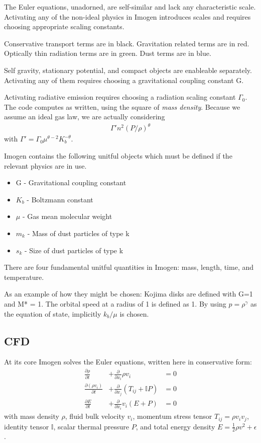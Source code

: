 \documentclass[letterpaper,12pt]{article}
\begin{document}
The Euler equations, unadorned, are self-similar and lack any characteristic scale. Activating
any of the non-ideal physics in Imogen introduces scales and requires choosing appropriate scaling
constants.

Conservative transport terms are in black. Gravitation related terms are in red.
Optically thin radiation terms are in green. Dust terms are in blue.

Self gravity, stationary potential, and compact objects are enableable separately.
Activating any of them requires choosing a gravitational coupling constant G.

Activating radiative emission requires choosing a radiation scaling constant $\Gamma_0$.
The code computes as written, using the square of \textit{mass density}. Because we assume an
ideal gas law, we are actually considering
\begin{align*}
\Gamma' n^2 (P/\rho)^{\theta}
\end{align*}
with $\Gamma' = \Gamma_0 \mu^{\theta-2} K_b^{-\theta}$.

Imogen contains the following unitful objects which must be defined if the relevant
physics are in use.
\begin{itemize}
\item G - Gravitational coupling constant
\item $K_b$ - Boltzmann constant
\item $\mu$ - Gas mean molecular weight
\item $m_k$ - Mass of dust particles of type k
\item $s_k$ - Size of dust particles of type k
\end{itemize}

There are four fundamental unitful quantities in Imogen: mass, length, time, and temperature.

As an example of how they might be chosen: Kojima disks are defined with G=1 and M* = 1. The
orbital speed at a radius of 1 is defined as 1. By using $p = \rho^\gamma$ as the equation
of state, implicitly $k_b/\mu$ is chosen.



\subsection{CFD}

At its core Imogen solves the Euler equations, written here in conservative form:
\begin{align*}
\frac{\partial \rho}{\partial t} &+ \frac{\partial}{\partial x_i} \rho v_i &= 0 \\
\frac{\partial (\rho v_i)}{\partial t} &+ \frac{\partial}{\partial x_j} (T_{ij} + \mathbb{I} P) &= 0 \\
\frac{\partial E}{\partial t} &+ \frac{\partial}{\partial x_i} v_i (E + P) &= 0
\end{align*}
with mass density $\rho$, fluid bulk velocity $v_i$, momentum stress tensor
$T_{ij} = \rho v_i v_j$, identity tensor $\mathbb{I}$, scalar thermal pressure $P$,
and total energy density $E = \frac{1}{2} \rho v^2 + \epsilon$.
\end{document}
